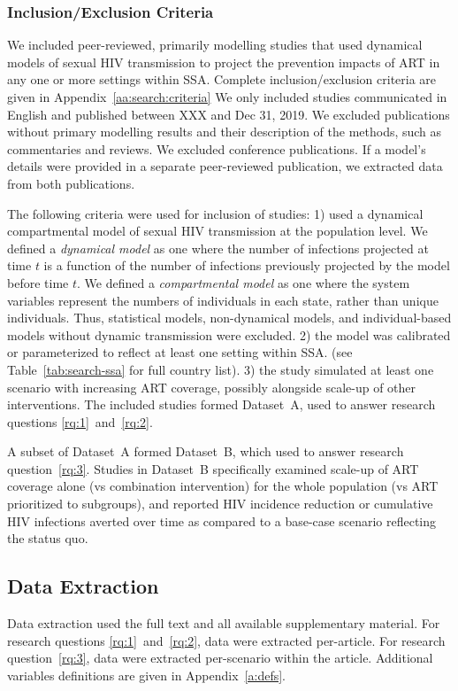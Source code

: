 \subsubsection{Inclusion/Exclusion Criteria}
\label{sss:meth:criteria}
We included peer-reviewed, primarily modelling studies that used dynamical models of sexual HIV transmission
to project the prevention impacts of ART in any one or more settings within SSA.
Complete inclusion/exclusion criteria are given in 
Appendix~\ref{aa:search:criteria}
We only included studies communicated in English and published between XXX and Dec 31, 2019.
We excluded publications without primary modelling results and their description of the methods,
such as commentaries and reviews. We excluded conference publications.
If a model's details were provided in a separate peer-reviewed publication,
we extracted data from both publications. %
\par
The following criteria were used for inclusion of studies:
1) used a dynamical compartmental model of
sexual HIV transmission at the population level.
We defined a \emph{dynamical model} as one where
the number of infections projected at time $t$ is a function of
the number of infections previously projected by the model before time $t$. %
We defined a \emph{compartmental model} as one where
the system variables represent the numbers of individuals in each state,
rather than unique individuals. %
Thus, statistical models, non-dynamical models, and individual-based models without dynamic transmission were excluded.
2) the model was calibrated or parameterized to reflect at least one setting within SSA.
(see Table~\ref{tab:search-ssa} for full country list).
3) the study simulated at least one scenario with increasing ART coverage,
possibly alongside scale-up of other interventions.
The included studies formed Dataset~A,
used to answer research questions \ref{rq:1}~and~\ref{rq:2}.
\par
A subset of Dataset~A formed Dataset~B,
which used to answer research question~\ref{rq:3}.
Studies in Dataset~B specifically examined
scale-up of ART coverage alone (vs combination intervention)
for the whole population (vs ART prioritized to subgroups),
and reported HIV incidence reduction or cumulative HIV infections averted over time 
as compared to a base-case scenario reflecting the status quo.
\subsection{Data Extraction}
\label{ss:meth:data}
Data extraction used the full text and all available supplementary material.
For research questions \ref{rq:1}~and~\ref{rq:2}, data were extracted per-article.
For research question~\ref{rq:3}, data were extracted per-scenario within the article.
Additional variables definitions are given in Appendix~\ref{a:defs}.
